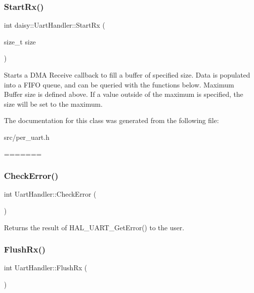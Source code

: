 \subsubsection{\texorpdfstring{Start\+Rx()}{StartRx()}}
{\footnotesize\ttfamily int daisy\+::\+Uart\+Handler\+::\+Start\+Rx (\begin{DoxyParamCaption}\item[{size\+\_\+t}]{size }\end{DoxyParamCaption})}

Starts a D\+MA Receive callback to fill a buffer of specified size. Data is populated into a F\+I\+FO queue, and can be queried with the functions below. Maximum Buffer size is defined above. If a value outside of the maximum is specified, the size will be set to the maximum. 

The documentation for this class was generated from the following file\+:\begin{DoxyCompactItemize}
\item 
src/per\+\_\+uart.\+h\end{DoxyCompactItemize}
=======
\mbox{\label{classdaisy_1_1_uart_handler_af45ffee5f49aeb10328a8844671fda8a}} 
\subsubsection{\texorpdfstring{Check\+Error()}{CheckError()}}
{\footnotesize\ttfamily int Uart\+Handler\+::\+Check\+Error (\begin{DoxyParamCaption}{ }\end{DoxyParamCaption})}

Returns the result of H\+A\+L\+\_\+\+U\+A\+R\+T\+\_\+\+Get\+Error() to the user. \mbox{\label{classdaisy_1_1_uart_handler_a7ca4eb52ebbf541f979282219b3fc674}} 
\subsubsection{\texorpdfstring{Flush\+Rx()}{FlushRx()}}
{\footnotesize\ttfamily int Uart\+Handler\+::\+Flush\+Rx (\begin{DoxyParamCaption}{ }\end{DoxyParamCaption})}

